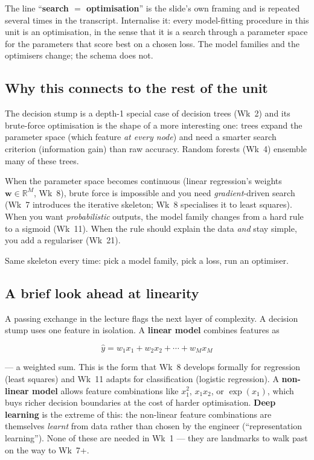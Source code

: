 \documentclass[11pt, a4paper]{article}
\begin{document}
\begin{notebox}
The line ``\textbf{search $=$ optimisation}'' is the slide's own framing and is repeated several times in the transcript. Internalise it: every model-fitting procedure in this unit is an optimisation, in the sense that it is a search through a parameter space for the parameters that score best on a chosen loss. The model families and the optimisers change; the schema does not.
\end{notebox}

\subsection{Why this connects to the rest of the unit}

The decision stump is a depth-1 special case of decision trees (Wk~2) and its brute-force optimisation is the shape of a more interesting one: trees expand the parameter space (which feature \emph{at every node}) and need a smarter search criterion (information gain) than raw accuracy. Random forests (Wk~4) ensemble many of these trees.

When the parameter space becomes continuous (linear regression's weights $\mathbf{w} \in \mathbb{R}^M$, Wk~8), brute force is impossible and you need \emph{gradient}-driven search (Wk~7 introduces the iterative skeleton; Wk~8 specialises it to least squares). When you want \emph{probabilistic} outputs, the model family changes from a hard rule to a sigmoid (Wk~11). When the rule should explain the data \emph{and} stay simple, you add a regulariser (Wk~21).

Same skeleton every time: pick a model family, pick a loss, run an optimiser.

\subsection{A brief look ahead at linearity}

A passing exchange in the lecture flags the next layer of complexity. A decision stump uses one feature in isolation. A \textbf{linear model} combines features as

\[
\hat{y} = w_1 x_1 + w_2 x_2 + \cdots + w_M x_M
\]

— a weighted sum. This is the form that Wk~8 develops formally for regression (least squares) and Wk~11 adapts for classification (logistic regression). A \textbf{non-linear model} allows feature combinations like $x_1^2$, $x_1 x_2$, or $\exp(x_1)$, which buys richer decision boundaries at the cost of harder optimisation. \textbf{Deep learning} is the extreme of this: the non-linear feature combinations are themselves \emph{learnt} from data rather than chosen by the engineer (``representation learning''). None of these are needed in Wk~1 — they are landmarks to walk past on the way to Wk~7+.
\end{document}
